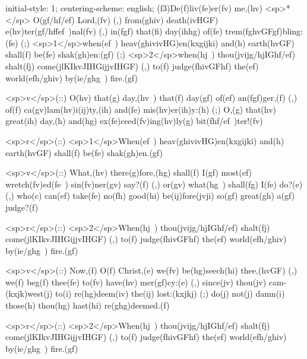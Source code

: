 initial-style: 1;
centering-scheme: english;
(f3)De(f)liv(fe)er(fv) me,(hv) <sp>*</sp> O(gf/hf/ef) Lord,(fv) (,) from(ghiv) death(ivHGF) e(hv)ter(gf/hffef~)nal(fv) (,) in(fgf) that(fi) day(ihhg) of(fe) trem(fghvGFgf)bling:(fe) (;) <sp>1</sp>when(ef~) heav(ghivivHG)en(kxgijki) and(h) earth(hvGF) shall(f) be(fe) shak(gh)en:(gf) (;) <sp>2</sp>when(hj~) thou(jvijg/hjIGhf/ef) shalt(fj) come(jlKIkvJIHGijjvIHGF) (,) to(f) judge(fhivGFhf) the(ef) world(efh/ghiv) by(ie/ghg~) fire.(gf)

<sp>v</sp>(::) O(hv) that(g) day,(hv~) that(f) day(gf) of(ef) an(fgf)ger,(f) (,) of(f) ca(gv)lam(hv)i(ij)ty,(ih) and(fe) mis(hv)er(ih)y:(h) (;) O,(g) that(hv) great(ih) day,(h) and(hg) ex(fe)ceed(fv)ing(hv)ly(g) bit(fhf/ef~)ter!(fv)

<sp>r</sp>(::) <sp>1</sp>When(ef~) heav(ghivivHG)en(kxgijki) and(h) earth(hvGF) shall(f) be(fe) shak(gh)en.(gf)

<sp>v</sp>(::) What,(hv) there(g)fore,(hg) shall(f) I(gf) most(ef) wretch(fv)ed(fe~) sin(fv)ner(gv) say?(f) (,) or(gv) what(hg~) shall(fg) I(fe) do?(e) (,) who(c) can(ef) take(fe) no(fh) good(hi) be(ij)fore(jvji) so(gf) great(gh) a(gf) judge?(f)

<sp>r</sp>(::) <sp>2</sp>When(hj~) thou(jvijg/hjIGhf/ef) shalt(fj) come(jlKIkvJIHGijjvIHGF) (,) to(f) judge(fhivGFhf) the(ef) world(efh/ghiv) by(ie/ghg~) fire.(gf)

<sp>v</sp>(::) Now,(f) O(f) Christ,(e) we(fv) be(hg)seech(hi) thee,(hvGF) (,) we(f) beg(f) thee(fe) to(fv) have(hv) mer(gf)cy:(e) (,) since(jv) thou(jv) cam-(kxjk)west(j) to(i) re(hg)deem(iv) the(ij) lost:(kxjkj) (;) do(j) not(j) damn(i) those(h) thou(hg) hast(hi) re(ghg)deemed.(f)

<sp>r</sp>(::) <sp>2</sp>When(hj~) thou(jvijg/hjIGhf/ef) shalt(fj) come(jlKIkvJIHGijjvIHGF) (,) to(f) judge(fhivGFhf) the(ef) world(efh/ghiv) by(ie/ghg~) fire.(gf) 